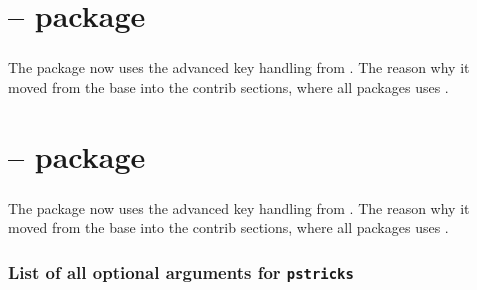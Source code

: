 \documentclass[11pt,english,BCOR=10mm,DIV12,bibliography=totoc,parskip=false,headings=small,,
    headinclude=false,footinclude=false,oneside]{pst-doc}
\begin{document}
\part{ -- package}

\section{}

The package  now uses the advanced key handling from . The reason
why it moved from the base into the contrib sections, where all packages uses .

\part{ -- package}

\section{}

The package  now uses the advanced key handling from . The reason
why it moved from the base into the contrib sections, where all packages uses .


\clearpage
\section{List of all optional arguments for \texttt{pstricks}}




\nocite{*}
\printbibliography

\printindex
\end{document}
